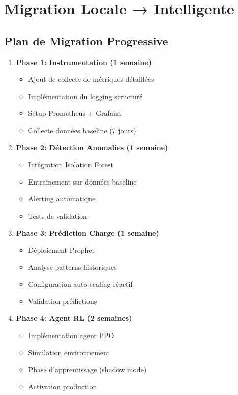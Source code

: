\documentclass[12pt,a4paper]{article}
\begin{document}
\section{Migration Locale → Intelligente}

\subsection{Plan de Migration Progressive}

\begin{enumerate}
    \item \textbf{Phase 1: Instrumentation (1 semaine)}
    \begin{itemize}
        \item Ajout de collecte de métriques détaillées
        \item Implémentation du logging structuré
        \item Setup Prometheus + Grafana
        \item Collecte données baseline (7 jours)
    \end{itemize}
    
    \item \textbf{Phase 2: Détection Anomalies (1 semaine)}
    \begin{itemize}
        \item Intégration Isolation Forest
        \item Entraînement sur données baseline
        \item Alerting automatique
        \item Tests de validation
    \end{itemize}
    
    \item \textbf{Phase 3: Prédiction Charge (1 semaine)}
    \begin{itemize}
        \item Déploiement Prophet
        \item Analyse patterns historiques
        \item Configuration auto-scaling réactif
        \item Validation prédictions
    \end{itemize}
    
    \item \textbf{Phase 4: Agent RL (2 semaines)}
    \begin{itemize}
        \item Implémentation agent PPO
        \item Simulation environnement
        \item Phase d'apprentissage (shadow mode)
        \item Activation production
    \end{itemize}
    

\end{enumerate}
\end{document}
